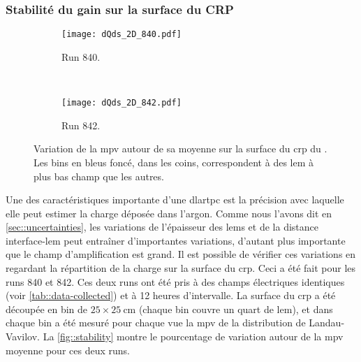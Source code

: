 
      \subsubsection{Stabilité du gain sur la surface du CRP}

        \begin{figure}[htbp]
          \centering
          \begin{subfigure}[t]{0.9\textwidth}
            \centering
            \texttt{[image: dQds\_2D\_840.pdf]}
            \caption[]{Run 840.}
          \end{subfigure}\\
          \begin{subfigure}[t]{0.9\textwidth}
            \centering
            \texttt{[image: dQds\_2D\_842.pdf]}
            \caption[]{Run 842.}
          \end{subfigure}
          \caption[Variation de la \gls{mpv} sur la surface du \gls{crp} dans le \TOO{}.]{\label{fig::stability}Variation de la \gls{mpv} autour de sa moyenne sur la surface du \gls{crp} du \TOO{}. Les bins en bleus foncé, dans les coins, correspondent à des \gls{lem} à plus bas champ que les autres.}
        \end{figure}

        Une des caractéristiques importante d'une \gls{dlartpc} est la précision avec laquelle elle peut estimer la charge déposée dans l'argon. Comme nous l'avons dit en \autoref{sec::uncertainties}, les variations de l'épaisseur des \glspl{lem} et de la distance interface-\gls{lem} peut entraîner d'importantes variations, d'autant plus importante que le champ d'amplification est grand. Il est possible de vérifier ces variations en regardant la répartition de la charge sur la surface du \gls{crp}. Ceci a été fait pour les runs 840 et 842. Ces deux runs ont été pris à des champs électriques identiques (voir \autoref{tab::data-collected}) et à 12 heures d'intervalle. La surface du \gls{crp} a été découpée en bin de $25\times\SI{25}{\centi\meter}$ (chaque bin couvre un quart de \gls{lem}), et dans chaque bin a été mesuré pour chaque vue la \gls{mpv} de la distribution de Landau-Vavilov. La \autoref{fig::stability} montre le pourcentage de variation autour de la \gls{mpv} moyenne pour ces deux runs. 


